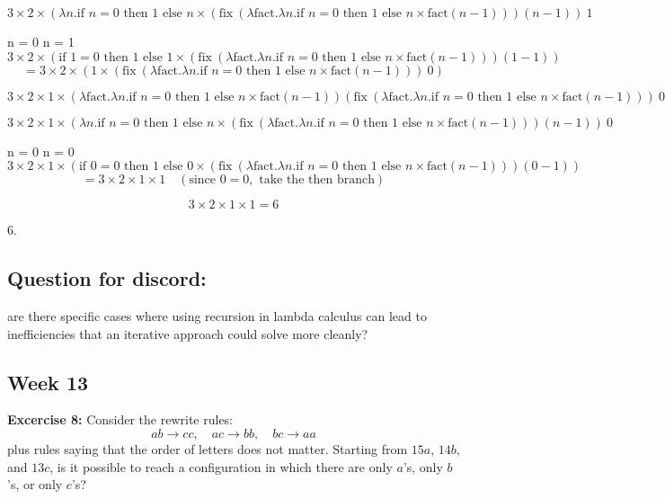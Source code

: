\documentclass{article}
\theoremstyle{theorem}
\theoremstyle{definition}
\theoremstyle{remark}
\begin{document}
\[
3 \times 2 \times (\lambda n. \text{if } n = 0 \text{ then } 1 \text{ else } n \times (\text{fix} \ (\lambda \text{fact}. \lambda n. \text{if } n = 0 \text{ then } 1 \text{ else } n \times \text{fact}(n - 1))) (n - 1)) \ 1
\]

  n = 0  n = 1
\[
3 \times 2 \times (\text{if } 1 = 0 \text{ then } 1 \text{ else } 1 \times (\text{fix} \ (\lambda \text{fact}. \lambda n. \text{if } n = 0 \text{ then } 1 \text{ else } n \times \text{fact}(n - 1))) (1 - 1))
\]
\[
= 3 \times 2 \times (1 \times (\text{fix} \ (\lambda \text{fact}. \lambda n. \text{if } n = 0 \text{ then } 1 \text{ else } n \times \text{fact}(n - 1))) \ 0)
\]

  
\[
3 \times 2 \times 1 \times (\lambda \text{fact}. \lambda n. \text{if } n = 0 \text{ then } 1 \text{ else } n \times \text{fact}(n - 1)) (\text{fix} \ (\lambda \text{fact}. \lambda n. \text{if } n = 0 \text{ then } 1 \text{ else } n \times \text{fact}(n - 1))) \ 0
\]

\[
3 \times 2 \times 1 \times (\lambda n. \text{if } n = 0 \text{ then } 1 \text{ else } n \times (\text{fix} \ (\lambda \text{fact}. \lambda n. \text{if } n = 0 \text{ then } 1 \text{ else } n \times \text{fact}(n - 1))) (n - 1)) \ 0
\]

  n = 0  n = 0
\[
3 \times 2 \times 1 \times (\text{if } 0 = 0 \text{ then } 1 \text{ else } 0 \times (\text{fix} \ (\lambda \text{fact}. \lambda n. \text{if } n = 0 \text{ then } 1 \text{ else } n \times \text{fact}(n - 1))) (0 - 1))
\]
\[
= 3 \times 2 \times 1 \times 1 \quad (\text{since } 0 = 0, \text{ take the } \text{then} \text{ branch})
\]

\[
3 \times 2 \times 1 \times 1 = 6
\]

 6.

\subsection*{Question for discord:}
are there specific cases where using recursion in lambda calculus can lead to inefficiencies that an iterative approach could solve more cleanly?



\subsection{Week 13}
\textbf{Excercise 8:}  
Consider the rewrite rules:  
\[
ab \to cc, \quad ac \to bb, \quad bc \to aa
\]
plus rules saying that the order of letters does not matter. Starting from \( 15a \), \( 14b \), and \( 13c \), is it possible to reach a configuration in which there are only \( a \)'s, only \( b \)'s, or only \( c \)'s?
\end{document}

